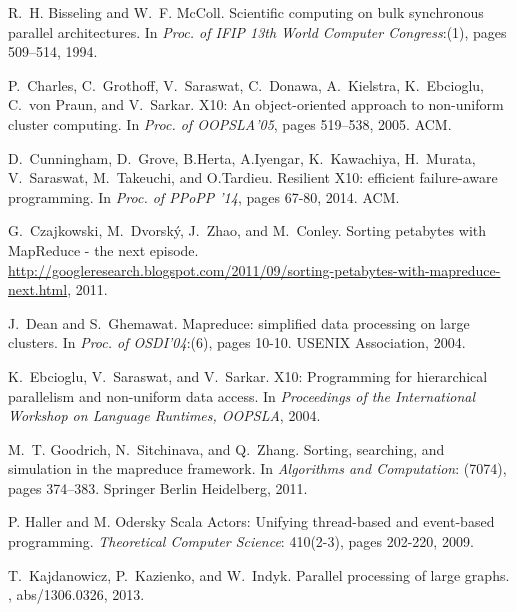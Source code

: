 \documentclass[a4paper]{article}
\numberwithin{equation}{section}
\begin{document}

\begin{thebibliography}{10}

R.~H. Bisseling and W.~F. McColl.
\newblock Scientific computing on bulk synchronous parallel architectures.
\newblock In {\em Proc. of IFIP 13th World Computer Congress}:(1), pages 509--514, 1994.

P.~Charles, C.~Grothoff, V.~Saraswat, C.~Donawa, A.~Kielstra, K.~Ebcioglu,
  C.~von Praun, and V.~Sarkar.
\newblock X10: An object-oriented approach to non-uniform cluster computing.
\newblock In {\em Proc. of OOPSLA'05}, pages 519--538, 2005. ACM.

D.~Cunningham, D.~Grove, B.Herta, A.Iyengar, K.~Kawachiya, H.~Murata,
V.~Saraswat, M.~Takeuchi, and O.Tardieu.
\newblock  Resilient X10: efficient failure-aware programming.
\newblock  In {\em Proc. of PPoPP '14}, pages 67-80, 2014. ACM. 
 
G.~Czajkowski, M.~Dvorsk\'y, J.~Zhao, and M.~Conley.
\newblock Sorting petabytes with {MapReduce} - the next episode.
\newblock
  \url{http://googleresearch.blogspot.com/2011/09/sorting-petabytes-with-mapreduce-next.html},
  2011.

J.~Dean and S.~Ghemawat.
\newblock Mapreduce: simplified data processing on large clusters.
\newblock In {\em Proc. of OSDI'04}:(6), pages 10-10. USENIX Association, 2004.

K.~Ebcioglu, V.~Saraswat, and V.~Sarkar.
\newblock X10: Programming for hierarchical parallelism and non-uniform data
  access.
\newblock In {\em Proceedings of the International Workshop on Language
  Runtimes, OOPSLA}, 2004.


M.~T. Goodrich, N.~Sitchinava, and Q.~Zhang.
\newblock Sorting, searching, and simulation in the mapreduce framework.
\newblock In {\em Algorithms and Computation}: (7074), pages 374--383.
  Springer Berlin Heidelberg, 2011.

P. Haller and M. Odersky
\newblock Scala Actors: Unifying thread-based and event-based programming. 
\newblock \emph{Theoretical Computer Science}: 410(2-3), pages 202-220, 2009.

T.~Kajdanowicz, P.~Kazienko, and W.~Indyk.
\newblock Parallel processing of large graphs.
, abs/1306.0326, 2013.


\end{thebibliography}
\end{document}
